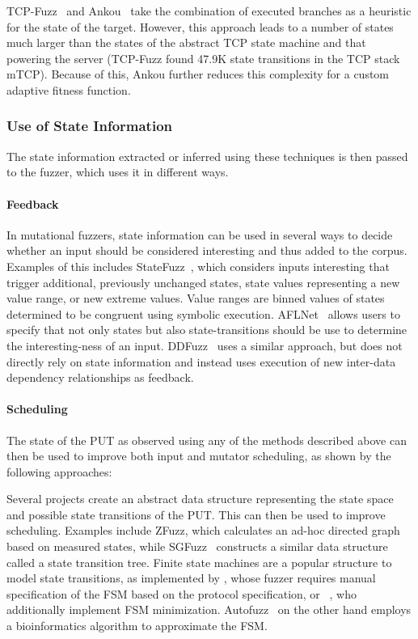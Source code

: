 \documentclass[twocolumn]{article}
\let\savedCite=\cite
\renewcommand{\cite}{\unskip~\savedCite}
\begin{document}
TCP-Fuzz\cite{TCPFuzz} and Ankou\cite{Ankou} take the combination of executed branches as a heuristic for the state of the target. However, this approach leads to a number of states much larger than the states of the abstract TCP state machine and that powering the server (TCP-Fuzz found 47.9K state transitions in the TCP stack mTCP). Because of this, Ankou further reduces this complexity for a custom adaptive fitness function.

\subsubsection{Use of State Information}
\label{RelatedWorks:ProtocolFuzzing:UseOfState}

The state information extracted or inferred using these techniques is then passed to the fuzzer, which uses it in different ways.

\paragraph{Feedback}

In mutational fuzzers, state information can be used in several ways to decide whether an input should be considered interesting and thus added to the corpus. Examples of this includes StateFuzz\cite{StateFuzz}, which considers inputs interesting that trigger additional, previously unchanged states, state values representing a new value range, or new extreme values. Value ranges are binned values of states determined to be congruent using symbolic execution. AFLNet\cite{AFLNET} allows users to specify that not only states but also state-transitions should be use to determine the interesting-ness of an input. DDFuzz\cite{DDFuzz} uses a similar approach, but does not directly rely on state information and instead uses execution of new inter-data dependency relationships as feedback.

\paragraph{Scheduling}

The state of the PUT as observed using any of the methods described above can then be used to improve both input and mutator scheduling, as shown by the following approaches:

Several projects create an abstract data structure representing the state space and possible state transitions of the PUT. This can then be used to improve scheduling. Examples include ZFuzz, which calculates an ad-hoc directed graph based on measured states, while SGFuzz\cite{SGFuzz} constructs a similar data structure called a state transition tree. Finite state machines are a popular structure to model state transitions, as implemented by \citeauthor{Congestion}, whose fuzzer requires manual specification of the FSM based on the protocol specification, or \citeauthor{ModelBased}\cite{ModelBased}, who additionally implement FSM minimization. Autofuzz\cite{Autofuzz} on the other hand employs a bioinformatics algorithm to approximate the FSM.
\end{document}
